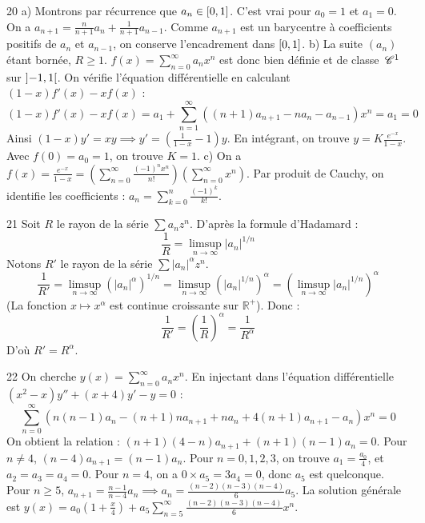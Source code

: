 \begin{correction}{20}
a) Montrons par récurrence que $a_n \in \left[0, 1\right]$. C'est vrai pour $a_0=1$ et $a_1=0$. 
On a $a_{n+1} = \frac{n}{n+1}a_n + \frac{1}{n+1}a_{n-1}$. Comme $a_{n+1}$ est un barycentre à coefficients positifs de $a_n$ et $a_{n-1}$, on conserve l'encadrement dans $\left[0, 1\right]$. 
b) La suite $(a_n)$ étant bornée, $R \ge 1$. $f(x) = \sum_{n=0}^\infty a_n x^n$ est donc bien définie et de classe $\,\mathscr C^{1}$ sur $\left]-1, 1\right[$. 
On vérifie l'équation différentielle en calculant $(1-x)f'(x) - xf(x)$ : 
$$ (1-x)f'(x) - xf(x) = a_1 + \sum_{n=1}^\infty \left( (n+1)a_{n+1} - na_n - a_{n-1} \right) x^n = a_1 = 0 $$ 
Ainsi $(1-x)y' = xy \implies y' = \left(\frac{1}{1-x} - 1\right)y$. 
En intégrant, on trouve $y = K \frac{e^{-x}}{1-x}$. Avec $f(0)=a_0=1$, on trouve $K=1$. 
c) On a $f(x) = \frac{e^{-x}}{1-x} = \left(\sum_{n=0}^\infty \frac{(-1)^n x^n}{n!}\right) \left(\sum_{n=0}^\infty x^n\right)$. 
Par produit de Cauchy, on identifie les coefficients : $a_n = \sum_{k=0}^n \frac{(-1)^k}{k!}$. 
\end{correction}

\begin{correction}{21}
Soit $R$ le rayon de la série $\sum a_n z^n$. 
D'après la formule d'Hadamard :
$$ \frac{1}{R} = \limsup_{n \to \infty} |a_n|^{1/n} $$ 
Notons $R'$ le rayon de la série $\sum |a_n|^\alpha z^n$. 
$$ \frac{1}{R'} = \limsup_{n \to \infty} (|a_n|^\alpha)^{1/n} = \limsup_{n \to \infty} (|a_n|^{1/n})^\alpha = \left( \limsup_{n \to \infty} |a_n|^{1/n} \right)^\alpha $$ 
(La fonction $x \mapsto x^\alpha$ est continue croissante sur $\mathbb{R}^+$). 
Donc :
$$ \frac{1}{R'} = \left(\frac{1}{R}\right)^\alpha = \frac{1}{R^\alpha} $$ 
D'où $R' = R^\alpha$. 
\end{correction}

\begin{correction}{22}
On cherche $y(x) = \sum_{n=0}^\infty a_n x^n$. 
En injectant dans l'équation différentielle $(x^2-x)y''+(x+4)y'-y=0$ : 
$$ \sum_{n=0}^\infty \left( n(n-1)a_n - (n+1)na_{n+1} + na_n + 4(n+1)a_{n+1} - a_n \right) x^n = 0 $$ 
On obtient la relation : $(n+1)(4-n)a_{n+1} + (n+1)(n-1)a_n = 0$. 
Pour $n \neq 4$, $(n-4)a_{n+1} = (n-1)a_n$. 
Pour $n=0, 1, 2, 3$, on trouve $a_1 = \frac{a_0}{4}$, et $a_2 = a_3 = a_4 = 0$. 
Pour $n=4$, on a $0 \times a_5 = 3a_4 = 0$, donc $a_5$ est quelconque. 
Pour $n \ge 5$, $a_{n+1} = \frac{n-1}{n-4}a_n \implies a_n = \frac{(n-2)(n-3)(n-4)}{6} a_5$. 
La solution générale est $y(x) = a_0 \left(1 + \frac{x}{4}\right) + a_5 \sum_{n=5}^\infty \frac{(n-2)(n-3)(n-4)}{6} x^n$. 
\end{correction}

